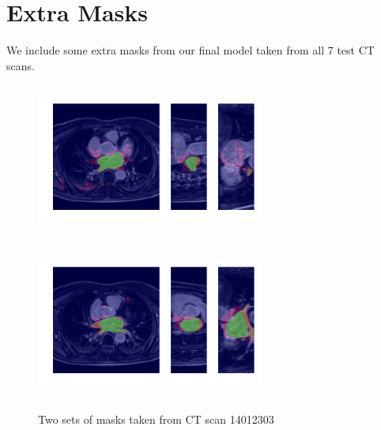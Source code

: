
\appendix
\chapter{Extra Masks}

We include some extra masks from our final model taken from all 7 test CT scans.

\begin{figure}[H]
\centering
\label{final_model}
\begin{minipage}{0.45\textwidth}
\centering
{\includegraphics[trim=0cm 2cm 0cm 2cm, clip=true, height=50mm, width=75mm]{Appendix/img/Masks_for_14012303_0.png}}
\end{minipage}\hfill
\begin{minipage}{0.45\textwidth}
\centering
{\includegraphics[trim=0cm 2cm 0cm 2cm, clip=true, height=50mm, width=75mm]{Appendix/img/Masks_for_14012303_1.png}}
\end{minipage}
\caption{Two sets of masks taken from CT scan 14012303}
\end{figure}

